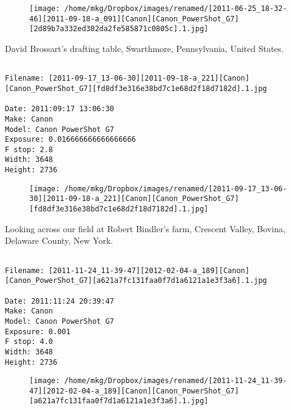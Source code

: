 \begin{figure}
\texttt{[image: /home/mkg/Dropbox/images/renamed/[2011-06-25\_18-32-46][2011-09-18-a\_091][Canon][Canon\_PowerShot\_G7][2d89b7a332ed302da2fe585871c0805c].1.jpg]}
\end{figure}
    
\clearpage
\onecolumn
\noindent David Brossart's drafting table, Swarthmore, Pennsylvania, United States.
\noindent
\begin{lstlisting}

Filename: [2011-09-17_13-06-30][2011-09-18-a_221][Canon][Canon_PowerShot_G7][fd8df3e316e38bd7c1e68d2f18d7182d].1.jpg

Date: 2011:09:17 13:06:30
Make: Canon
Model: Canon PowerShot G7
Exposure: 0.016666666666666666
F stop: 2.8
Width: 3648
Height: 2736
\end{lstlisting}
\clearpage

\begin{figure}
\texttt{[image: /home/mkg/Dropbox/images/renamed/[2011-09-17\_13-06-30][2011-09-18-a\_221][Canon][Canon\_PowerShot\_G7][fd8df3e316e38bd7c1e68d2f18d7182d].1.jpg]}
\end{figure}
    
\clearpage
\onecolumn
\noindent Looking across our field at Robert Bindler's farm, Crescent Valley, Bovina, Delaware County, New York.
\noindent
\begin{lstlisting}

Filename: [2011-11-24_11-39-47][2012-02-04-a_189][Canon][Canon_PowerShot_G7][a621a7fc131faa0f7d1a6121a1e3f3a6].1.jpg

Date: 2011:11:24 20:39:47
Make: Canon
Model: Canon PowerShot G7
Exposure: 0.001
F stop: 4.0
Width: 3648
Height: 2736
\end{lstlisting}
\clearpage

\begin{figure}
\texttt{[image: /home/mkg/Dropbox/images/renamed/[2011-11-24\_11-39-47][2012-02-04-a\_189][Canon][Canon\_PowerShot\_G7][a621a7fc131faa0f7d1a6121a1e3f3a6].1.jpg]}
\end{figure}
    
